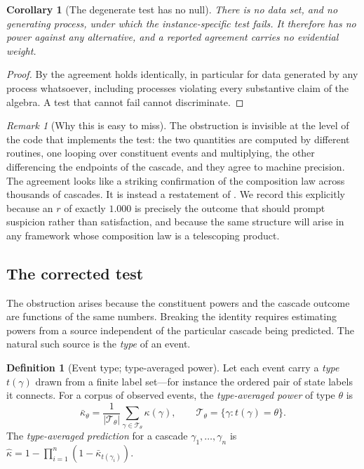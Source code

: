 \documentclass[11pt,a4paper]{article}
\theoremstyle{thmstyle}
\newtheorem{corollary}[theorem]{Corollary}
\theoremstyle{definition}
\newtheorem{definition}[theorem]{Definition}
\theoremstyle{remark}
\newtheorem{remark}[theorem]{Remark}
\newcommand{\kap}{\kappa}
\newcommand{\abs}[1]{\lvert#1\rvert}
\begin{document}
\begin{corollary}[The degenerate test has no null]
\label{cor:no-null}
There is no data set, and no generating process, under which the
instance-specific test fails. It therefore has no power against any
alternative, and a reported agreement carries no evidential weight.
\end{corollary}

\begin{proof}
By  the agreement holds identically, in particular for
data generated by any process whatsoever, including processes violating
every substantive claim of the algebra. A test that cannot fail cannot
discriminate.
\end{proof}

\begin{remark}[Why this is easy to miss]
\label{rem:easy-to-miss}
The obstruction is invisible at the level of the code that implements the
test: the two quantities are computed by different routines, one looping
over constituent events and multiplying, the other differencing the
endpoints of the cascade, and they agree to machine precision. The agreement
looks like a striking confirmation of the composition law across thousands
of cascades. It is instead a restatement of . We
record this explicitly because an $r$ of exactly $1.000$ is precisely the
outcome that should prompt suspicion rather than satisfaction, and because
the same structure will arise in any framework whose composition law is a
telescoping product.
\end{remark}

\subsection{The corrected test}

The obstruction arises because the constituent powers and the cascade
outcome are functions of the same numbers. Breaking the identity requires
estimating powers from a source independent of the particular cascade being
predicted. The natural such source is the \emph{type} of an event.

\begin{definition}[Event type; type-averaged power]
\label{def:type}
Let each event carry a \emph{type} $t(\gamma)$ drawn from a finite label
set---for instance the ordered pair of state labels it connects. For a
corpus of observed events, the \emph{type-averaged power} of type $\theta$
is
\[
\bar\kap_\theta=\frac{1}{\abs{\mathcal{T}_\theta}}
\sum_{\gamma\in\mathcal{T}_\theta}\kap(\gamma),
\qquad
\mathcal{T}_\theta=\{\gamma : t(\gamma)=\theta\}.
\]
The \emph{type-averaged prediction} for a cascade
$\gamma_1,\dots,\gamma_n$ is
$\hat\kap=1-\prod_{i=1}^{n}(1-\bar\kap_{t(\gamma_i)})$.
\end{definition}
\end{document}

